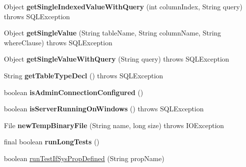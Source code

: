 \begin{DoxyCompactItemize}
\item 
\mbox{\label{classtestsuite_1_1_base_test_case_a863b877857af0632dbdfb73b3cc0dfcc}} 
Object {\bfseries get\+Single\+Indexed\+Value\+With\+Query} (int column\+Index, String query)  throws S\+Q\+L\+Exception 
\item 
\mbox{\label{classtestsuite_1_1_base_test_case_acd63545de5bb38d1a442c2a09d3bddc4}} 
Object {\bfseries get\+Single\+Value} (String table\+Name, String column\+Name, String where\+Clause)  throws S\+Q\+L\+Exception 
\item 
\mbox{\label{classtestsuite_1_1_base_test_case_a64b5c6d2782cd2ac6f359edf9b5c7365}} 
Object {\bfseries get\+Single\+Value\+With\+Query} (String query)  throws S\+Q\+L\+Exception 
\item 
\mbox{\label{classtestsuite_1_1_base_test_case_a216bda00cffb011320f200b5dd78310d}} 
String {\bfseries get\+Table\+Type\+Decl} ()  throws S\+Q\+L\+Exception 
\item 
\mbox{\label{classtestsuite_1_1_base_test_case_a0c430c33af3faad8e9490abda2054142}} 
boolean {\bfseries is\+Admin\+Connection\+Configured} ()
\item 
\mbox{\label{classtestsuite_1_1_base_test_case_a38e227a349a04887dd5fdff34c746389}} 
boolean {\bfseries is\+Server\+Running\+On\+Windows} ()  throws S\+Q\+L\+Exception 
\item 
\mbox{\label{classtestsuite_1_1_base_test_case_a2fb4c1ccc05d5db9f33abb34e9c2a9a7}} 
File {\bfseries new\+Temp\+Binary\+File} (String name, long size)  throws I\+O\+Exception 
\item 
\mbox{\label{classtestsuite_1_1_base_test_case_ae5d273da4f580cf9778ec0c7c7072fad}} 
final boolean {\bfseries run\+Long\+Tests} ()
\item 
boolean \mbox{\hyperlink{classtestsuite_1_1_base_test_case_a3578b222700fc502212ce9834194ebaa}{run\+Test\+If\+Sys\+Prop\+Defined}} (String prop\+Name)
\item 

\end{DoxyCompactItemize}
